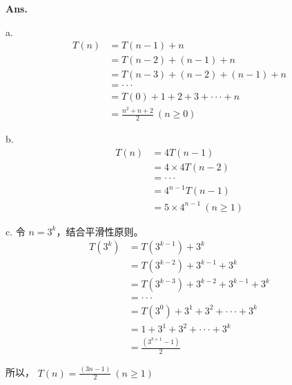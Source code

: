 \documentclass[12pt, a4paper, UTF8, fontset=windows]{ctexbook}
\newenvironment{solution}{\par\noindent\textbf{Ans.}}{\par}
\begin{document}
\begin{solution}

    a. 
    \begin{align*}
        T(n) &= T(n-1) + n \\
          &= T(n-2) + (n - 1) + n \\
          &= T(n-3) + (n - 2) + (n -1 ) + n \\
          &= ··· \\
          &= T(0) + 1 + 2 + 3 + ··· + n \\
          &= \frac{n^2 + n + 2}{2} ~(n \ge 0)
    \end{align*}

    b.
    \begin{align*}
        T(n) &= 4T(n-1) \\
          &= 4 \times 4 T(n-2) \\
          &= ··· \\
          &= 4^{n-1} T(n-1) \\ 
          &= 5 \times 4^{n-1} ~(n \ge 1)
    \end{align*}

    c.
    令 $n = 3^k$，结合平滑性原则。
    \begin{align*}
        T(3^k) &= T(3^{k-1}) + 3^k \\
          &= T(3^{k-2}) + 3^{k-1} + 3^k \\
          &= T(3^{k-3}) + 3^{k-2} + 3^{k-1} + 3^k \\
          &= ··· \\
          &= T(3^0) + 3^1 + 3^2 + ··· + 3^k \\
          &= 1 + 3^1 + 3^2 + ··· + 3^k \\
          &= \frac{(3^{k+1} - 1)}{2}
    \end{align*}
    
    所以， $T(n) = \frac{(3n-1)}{2} ~(n \ge 1)$
\end{solution}
\end{document}

